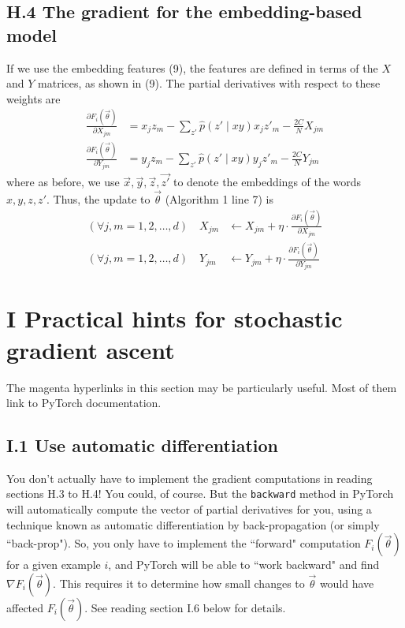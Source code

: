\subsection*{H.4 The gradient for the embedding-based model}

If we use the embedding features (9), the features are defined in terms of the $X$ and $Y$ matrices, as shown in (9). The partial derivatives with respect to these weights are
\begin{align}
\frac{\partial F_i(\vec{\theta})}{\partial X_{jm}} &= x_j z_m - \sum_{z'} \hat{p}(z' \mid xy)x_j z'_m - \frac{2C}{N}X_{jm} \\
\frac{\partial F_i(\vec{\theta})}{\partial Y_{jm}} &= y_j z_m - \sum_{z'} \hat{p}(z' \mid xy)y_j z'_m - \frac{2C}{N}Y_{jm}
\end{align}
where as before, we use $\vec{x}, \vec{y}, \vec{z}, \vec{z'}$ to denote the embeddings of the words $x, y, z, z'$. Thus, the update to $\vec{\theta}$ (Algorithm 1 line 7) is
\begin{align}
(\forall j,m = 1,2,\ldots,d) \quad X_{jm} &\gets X_{jm} + \eta \cdot \frac{\partial F_i(\vec{\theta})}{\partial X_{jm}} \\
(\forall j,m = 1,2,\ldots,d) \quad Y_{jm} &\gets Y_{jm} + \eta \cdot \frac{\partial F_i(\vec{\theta})}{\partial Y_{jm}}
\end{align}

\section*{ I Practical hints for stochastic gradient ascent}

The magenta hyperlinks in this section may be particularly useful. Most of them link to PyTorch documentation.

\subsection*{I.1 Use automatic differentiation}

You don’t actually have to implement the gradient computations in reading sections H.3 to H.4! You could, of course. But the \texttt{backward} method in PyTorch will automatically compute the vector of partial derivatives for you, using a technique known as automatic differentiation by back-propagation (or simply ``back-prop"). So, you only have to implement the ``forward" computation $F_i(\vec{\theta})$ for a given example $i$, and PyTorch will be able to ``work backward" and find $\nabla F_i(\vec{\theta})$. This requires it to determine how small changes to $\vec{\theta}$ would have affected $F_i(\vec{\theta})$. See reading section I.6 below for details.

